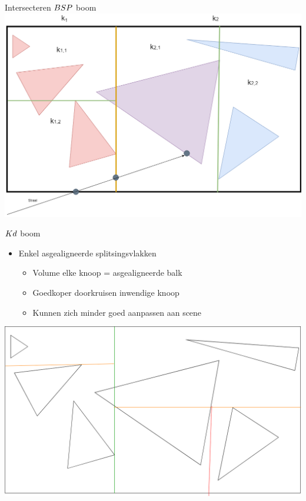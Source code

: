 \documentclass[11pt,t]{beamer}
\begin{document}
\begin{frame}[c]{Intersecteren $BSP$ boom}
	\includegraphics[width=0.8\paperwidth]{../img/volumeSplitTraversal}
\end{frame}

\begin{frame}{$Kd$ boom}
	\begin{itemize}
	\item Enkel asgealigneerde splitsingsvlakken
		\begin{itemize}
			\item Volume elke knoop = asgealigneerde balk
			\item Goedkoper doorkruisen inwendige knoop
			\item Kunnen zich minder goed aanpassen aan scene
		\end{itemize}
	\end{itemize}
	\pause
	\vspace{5pt}
	\hspace{5pt}
	\includegraphics[height=0.5\paperheight]{../img/splitsing-Kd}

\end{frame}
\end{document}
